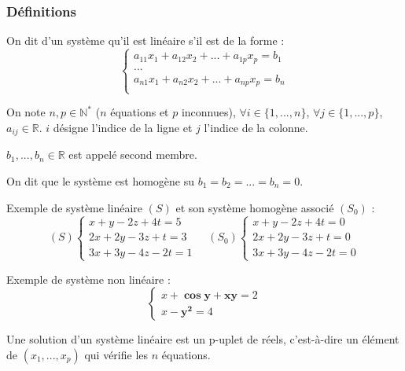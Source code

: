 \subsubsection{Définitions}
\begin{defi}
On dit d'un système qu'il est linéaire s'il est de la forme :
$$
\left\{
\begin{array}{l}
a_{11}x_1 + a_{12}x_2 + ... + a_{1p}x_p = b_1 \\
... \\ 
a_{n1}x_1 + a_{n2}x_2 + ... + a_{np}x_p = b_n \\
\end{array}
\right.
$$

On note $n,p\in \mathbb{N}^*$ ($n$ équations et $p$ inconnues), $\forall i\in \{1,...,n\}$, $\forall j\in \{1,...,p\}$, $a_{ij} \in \mathbb{R}$. $i$ désigne l'indice de la ligne et $j$ l'indice de la colonne. 

$b_1, ..., b_n \in \mathbb{R}$ est appelé second membre. 
\end{defi}

\begin{defi}
On dit que le système est homogène su $b_1=b_2=...=b_n=0$.
\end{defi}


\begin{exemple}
Exemple de système linéaire $(S)$ et son système homogène associé $(S_0)$ :
$$
(S) \left\{
\begin{array}{l}
x+y-2z + 4t = 5 \\
2x+2y-3z+t=3 \\
3x+3y-4z-2t=1
\end{array}
\right.
\quad
(S_0) \left\{
\begin{array}{l}
x+y-2z + 4t = 0 \\
2x+2y-3z+t=0 \\
3x+3y-4z-2t=0
\end{array}
\right.
$$

Exemple de système non linéaire :
$$
\left\{
\begin{array}{l}
x+\mathbf{\cos y} + \mathbf{xy} =2 \\
x-\mathbf{y^2} = 4
\end{array}
\right.$$

\end{exemple}

\begin{defi}
Une solution d'un système linéaire est un p-uplet de réels, c'est-à-dire un élément de $(x_1,...,x_p)$ qui vérifie les $n$ équations. 
\end{defi}


